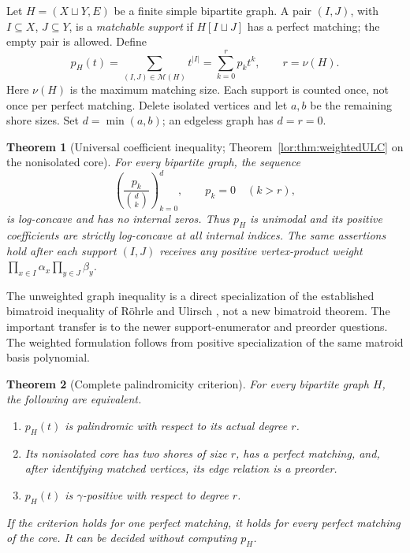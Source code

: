 \documentclass[11pt]{article}
\numberwithin{equation}{section}
\newtheorem{theorem}{Theorem}[section]
\theoremstyle{definition}
\newcommand{\PM}{\mathcal M}
\begin{document}
Let $H=(X\sqcup Y,E)$ be a finite simple bipartite graph. A pair
$(I,J)$, with $I\subseteq X$, $J\subseteq Y$, is a \emph{matchable support}
if $H[I\sqcup J]$ has a perfect matching; the empty pair is allowed. Define
\[
 p_H(t)=\sum_{(I,J)\in\PM(H)}t^{|I|}=\sum_{k=0}^{r}p_k t^k,
 \qquad r=\nu(H).
\]
Here $\nu(H)$ is the maximum matching size. Each support is counted once,
not once per perfect matching. Delete isolated vertices and let $a,b$ be the
remaining shore sizes. Set $d=\min(a,b)$; an edgeless graph has $d=r=0$.

\begin{theorem}[Universal coefficient inequality; Theorem~\ref{lor:thm:weightedULC} on the nonisolated core]
\label{lor:sp:thm:headline-ulc}
For every bipartite graph, the sequence
\[
 \left(\frac{p_k}{\binom d k}\right)_{k=0}^{d},
 \qquad p_k=0\quad(k>r),
\]
is log-concave and has no internal zeros. Thus $p_H$ is unimodal and its
positive coefficients are strictly log-concave at all internal indices.
The same assertions hold after each support $(I,J)$ receives any positive
vertex-product weight $\prod_{x\in I}\alpha_x\prod_{y\in J}\beta_y$.
\end{theorem}

The unweighted graph inequality is a direct specialization of the established
bimatroid inequality of R\"ohrle and Ulirsch \cite[Theorem A]{RU}, not a new
bimatroid theorem. The important transfer is to the newer support-enumerator
and preorder questions. The weighted formulation follows from positive
specialization of the same matroid basis polynomial.

\begin{theorem}[Complete palindromicity criterion]
\label{lor:sp:thm:headline-pal}
For every bipartite graph $H$, the following are equivalent.
\begin{enumerate}[label=(\roman*),leftmargin=2em]
\item $p_H(t)$ is palindromic with respect to its actual degree $r$.
\item Its nonisolated core has two shores of size $r$, has a perfect matching,
and, after identifying matched vertices, its edge relation is a preorder.
\item $p_H(t)$ is $\gamma$-positive with respect to degree $r$.
\end{enumerate}
If the criterion holds for one perfect matching, it holds for every perfect
matching of the core. It can be decided without computing $p_H$.
\end{theorem}
\end{document}
